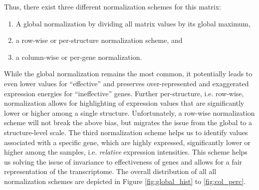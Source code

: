 \documentclass[]{article}
\begin{document}
Thus, there exist three different normalization schemes for this matrix: 
\begin{enumerate}
	\item A global normalization by dividing all matrix values by its global maximum, 
	\item a row-wise or per-structure normalization scheme, and
	\item a column-wise or per-gene normalization.
\end{enumerate}

While the global normalization remains the most common, it potentially leads to even lower values for ``effective'' and preserves over-represented and exaggerated expression energies for ``ineffective'' genes.
Further per-structure, i.e. row-wise, normalization allows for highlighting of expression values that are significantly lower or higher among a single structure. Unfortunately, a row-wise normalization scheme will not break the above bias, but migrates the issue from the global to a structure-level scale. The third normalization scheme helps us to identify values associated with a specific gene, which are highly expressed, significantly lower or higher among the samples, i.e. \textit{relative} expression intensities. This scheme helps us solving the issue of invariance to effectiveness of genes and allows for a fair representation of the transcriptome. The overall distribution of all all normalization schemes are depicted in Figure \ref{fig:global_hist} to \ref{fig:col_perc}.\\
\end{document}
